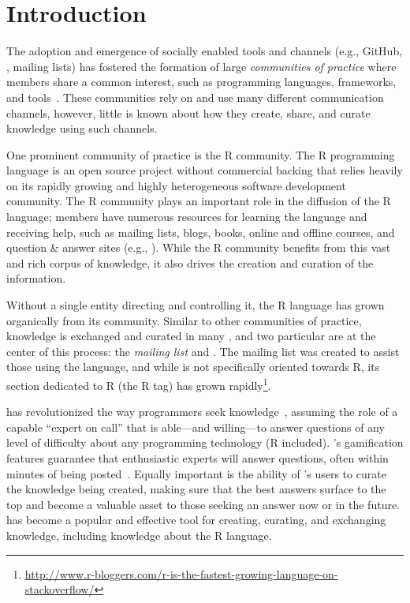 \section{Introduction}
\label{cha:introduction}
The adoption and emergence of socially enabled tools and channels (e.g., GitHub, \SO, mailing lists) has fostered the formation of large \textit{communities of practice} where members share a common interest, such as programming languages, frameworks, and tools~\cite{Storey2014}. These communities rely on and use many different communication channels, however, little is known about how they create, share, and curate knowledge using such channels. 

One prominent community of practice is the R community. The R programming language is an open source project without commercial backing that relies heavily on its rapidly growing and highly heterogeneous software development community. The R community plays an important role in the diffusion of the R language; members have numerous resources for learning the language and receiving help, such as mailing lists, blogs, books, online and offline courses, and question \& answer sites (e.g., \SO). While the R community benefits from this vast and rich corpus of knowledge, it also drives the creation and curation of the information.

Without a single entity directing and controlling it, the R language has grown organically from its community. Similar to other communities of practice, knowledge is exchanged and curated in many \channels, and two particular \channels are at the center of this process: the \textit{\RH mailing list} and \textit{\SO}. The \RH mailing list was created to assist those using the language, and while \SO is not specifically oriented towards R, its section dedicated to R (the R tag) has grown rapidly\footnote{\href{http://www.r-bloggers.com/r-is-the-fastest-growing-language-on-stackoverflow/}{http://www.r-bloggers.com/r-is-the-fastest-growing-language-on-stackoverflow/}}.

\SO has revolutionized the way programmers seek knowledge~\cite{li2013help,Vasilescu2014c}, assuming the role of a capable ``expert on call'' that is able---and willing---to answer questions of any level of difficulty about any programming technology (R included). \SO's gamification features guarantee that enthusiastic experts will answer questions, often within minutes of being posted~\cite{Mamykina2011}. Equally important is the ability of \SO's users to curate the knowledge being created, making sure that the best answers surface to the top and become a valuable asset to those seeking an answer now or in the future. \SO has become a popular and effective tool for creating, curating, and exchanging knowledge, including knowledge about the R language.

